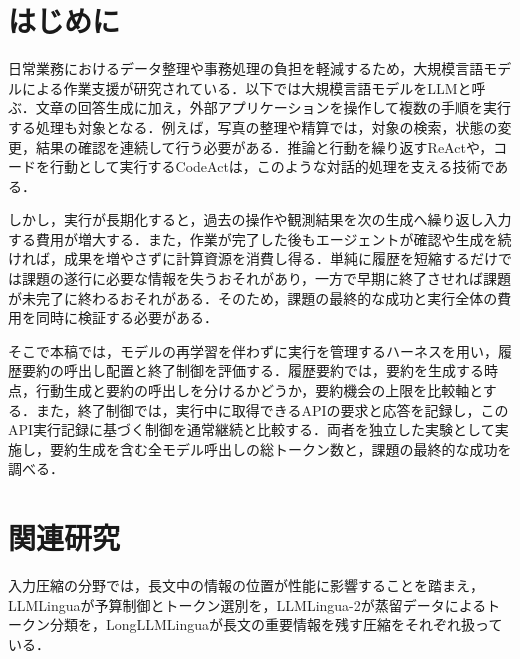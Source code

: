 \documentclass[letter]{ieicej}
\begin{document}
\maketitle



\section{はじめに}

日常業務におけるデータ整理や事務処理の負担を軽減するため，大規模言語モデルによる作業支援が研究されている．以下では大規模言語モデルをLLMと呼ぶ．文章の回答生成に加え，外部アプリケーションを操作して複数の手順を実行する処理も対象となる．例えば，写真の整理や精算では，対象の検索，状態の変更，結果の確認を連続して行う必要がある．推論と行動を繰り返すReAct\cite{yao2023react}や，コードを行動として実行するCodeAct\cite{wang2024codeact}は，このような対話的処理を支える技術である．

しかし，実行が長期化すると，過去の操作や観測結果を次の生成へ繰り返し入力する費用が増大する．また，作業が完了した後もエージェントが確認や生成を続ければ，成果を増やさずに計算資源を消費し得る．単純に履歴を短縮するだけでは課題の遂行に必要な情報を失うおそれがあり，一方で早期に終了させれば課題が未完了に終わるおそれがある．そのため，課題の最終的な成功と実行全体の費用を同時に検証する必要がある．

そこで本稿では，モデルの再学習を伴わずに実行を管理するハーネスを用い，履歴要約の呼出し配置と終了制御を評価する．履歴要約では，要約を生成する時点，行動生成と要約の呼出しを分けるかどうか，要約機会の上限を比較軸とする．また，終了制御では，実行中に取得できるAPIの要求と応答を記録し，このAPI実行記録に基づく制御を通常継続と比較する．両者を独立した実験として実施し，要約生成を含む全モデル呼出しの総トークン数と，課題の最終的な成功を調べる．

\par\noindent\begin{minipage}{\columnwidth}
\section{関連研究}

入力圧縮の分野では，長文中の情報の位置が性能に影響すること\cite{liu2024lost}を踏まえ，LLMLingua\cite{jiang2023llmlingua}が予算制御とトークン選別を，LLMLingua-2\cite{pan2024llmlingua2}が蒸留データによるトークン分類を，LongLLMLingua\cite{jiang2024longllmlingua}が長文の重要情報を残す圧縮をそれぞれ扱っている．

\end{minipage}\par{}
\end{document}
